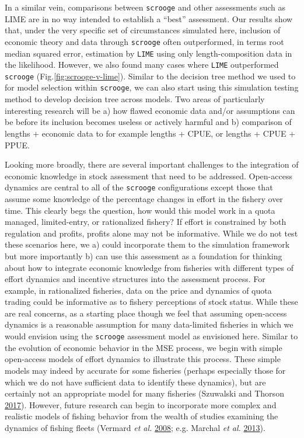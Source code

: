 \documentclass[twoside,12pt,final]{ucthesis-CA2012}
\begin{document}
\begin{ucmainmatter}
In a similar vein, comparisons between \texttt{scrooge} and other
assessments such as LIME are in no way intended to establish a ``best''
assessment. Our results show that, under the very specific set of
circumstances simulated here, inclusion of economic theory and data
through \texttt{scrooge} often outperformed, in terms root median
squared error, estimation by \texttt{LIME} using only length-composition
data in the likelihood. However, we also found many cases where
\texttt{LIME} outperformed \texttt{scrooge}
(Fig.\ref{fig:scrooge-v-lime}). Similar to the decision tree method we
used to for model selection within \texttt{scrooge}, we can also start
using this simulation testing method to develop decision tree across
models. Two areas of particularly interesting research will be a) how
flawed economic data and/or assumptions can be before its inclusion
becomes useless or actively harmful and b) comparison of lengths +
economic data to for example lengths + CPUE, or lengths + CPUE + PPUE.

Looking more broadly, there are several important challenges to the
integration of economic knowledge in stock assessment that need to be
addressed. Open-access dynamics are central to all of the
\texttt{scrooge} configurations except those that assume some knowledge
of the percentage changes in effort in the fishery over time. This
clearly begs the question, how would this model work in a quota managed,
limited-entry, or rationalized fishery? If effort is constrained by both
regulation and profits, profits alone may not be informative. While we
do not test these scenarios here, we a) could incorporate them to the
simulation framework but more importantly b) can use this assessment as
a foundation for thinking about how to integrate economic knowledge from
fisheries with different types of effort dynamics and incentive
structures into the assessment process. For example, in rationalized
fisheries, data on the price and dynamics of quota trading could be
informative as to fishery perceptions of stock status. While these are
real concerns, as a starting place though we feel that assuming
open-access dynamics is a reasonable assumption for many data-limited
fisheries in which we would envision using the \texttt{scrooge}
assessment model as envisioned here. Similar to the evolution of
economic behavior in the MSE process, we begin with simple open-access
models of effort dynamics to illustrate this process. These simple
models may indeed by accurate for some fisheries (perhaps especially
those for which we do not have sufficient data to identify these
dynamics), but are certainly not an appropriate model for many fisheries
(Szuwalski and Thorson \protect\hyperlink{ref-Szuwalski2017}{2017}).
However, future research can begin to incorporate more complex and
realistic models of fishing behavior from the wealth of studies
examining the dynamics of fishing fleets (Vermard \emph{et al.}
\protect\hyperlink{ref-Vermard2008}{2008}; e.g. Marchal \emph{et al.}
\protect\hyperlink{ref-Marchal2013}{2013}).


\end{ucmainmatter}
\end{document}
